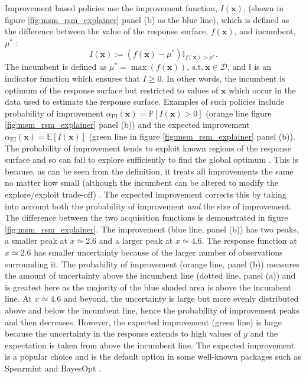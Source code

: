 Improvement based policies use the improvement function, $I(\mathbf{x})$, (shown in figure \ref{fig:msm_rsm_explainer} panel (b) as the blue line), which is defined as the  difference between the value of the response surface, $f(\mathbf{x})$, and incumbent, $\mu^{*}$ \cite{shahriariTakingHumanOut2016}:
\begin{equation}
    I(\mathbf{x}):=\left(f(\mathbf{x}) - \mu^{*}\right) \mathbb{I}_{f(\mathbf{x}) > \mu^{*}}. 
\end{equation}
The incumbent \cite{brochuTutorialBayesianOptimization2010} is defined as $\mu^{*}=\max{\left(f(\mathbf{x})\right)},\ \mathrm{s.t.}\ \mathbf{x} \in \mathcal{D}$, and $\mathbb{I}$ is an indicator function which ensures that $I \ge 0$. In other words, the incumbent is optimum of the response surface but restricted to values of $\mathbf{x}$ which occur in the data used to estimate the response surface. Examples of such policies include probability of improvement \cite{Kushner1963} $\alpha_{\mathrm{PI}}(\mathbf{x}) = \mathbb{P}\left[I(\mathbf{x})>0\right]$  (orange line figure \ref{fig:msm_rsm_explainer} panel (b)) and the expected improvement \cite{mockus1978application} $\alpha_{\mathrm{EI}}(\mathbf{x}) = \mathbb{E}\left[I(\mathbf{x})\right]$ (green line in figure \ref{fig:msm_rsm_explainer} panel (b)). The probability of improvement tends to exploit known regions of the response surface and so can fail to explore sufficiently to find the global optimum \cite{jones2001taxonomy}. This is because, as can be seen from the definition, it treats all improvements the same no matter how small (although the incumbent can be altered to modify the explore/exploit trade-off) \cite{jones2001taxonomy}.  The expected improvement corrects this by taking into account both the probability of improvement \emph{and} the size of improvement. The difference between the two acquisition functions is demonstrated in figure \ref{fig:msm_rsm_explainer}. The improvement (blue line, panel (b)) has two peaks, a smaller peak at $x\simeq 2.6$ and a larger peak at $x\simeq 4.6$. The response function at $x\simeq 2.6$ has smaller uncertainty because of the larger number of observations surrounding it. The probability of improvement (orange line, panel (b)) measures the amount of uncertainty above the incumbent line (dotted line, panel (a)) and is greatest here as the majority of the blue shaded area is above the incumbent line. At $x\simeq 4.6$ and beyond, the uncertainty is large but more evenly distributed above and below the incumbent line, hence the probability of improvement peaks and then decreases. However, the expected improvement (green line) is large because the uncertainty in the response extends to high values of $y$ and the expectation is taken from above the incumbent line.  The expected improvement is a popular choice \cite{feurer2019hyperparameter} and is the default option in some well-known packages such as Spearmint \cite{NIPS2012_4522} and BayesOpt \cite{martinez-cantinBayesOptBayesianOptimization2014}. 

